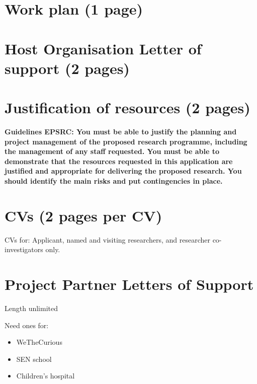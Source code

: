 \documentclass[11pt,a4paper]{report}
\newcommand{\epsrc}[1]{{\color{teal}\textbf{Guidelines EPSRC: #1}}}
\begin{document}
\pagebreak


\pagebreak
\chapter{Work plan (1 page)}
\pagebreak


\begin{landscape}
\begin{figure}[!ht]
\resizebox{\linewidth}{!}{
    
}
\end{figure}
\end{landscape}
\pagebreak


\chapter{Host Organisation Letter of support (2 pages)}
\pagebreak

\chapter{Justification of resources (2 pages)}

\epsrc{You must be able to justify the planning and project management of the
proposed research programme, including the management of any staff requested.
You must be able to demonstrate that the resources requested in this application
are justified and appropriate for delivering the proposed research.  You should
identify the main risks and put contingencies in place.  }


\pagebreak

\pagebreak

\chapter{CVs (2 pages per CV)}

CVs for: Applicant, named and visiting researchers, and researcher
co-investigators only.
\pagebreak


\pagebreak


\chapter{Project Partner Letters of Support}

Length unlimited

Need ones for:

\begin{itemize}
    \item WeTheCurious
    \item SEN school
    \item Children's hospital
\end{itemize}
\pagebreak
\end{document}

